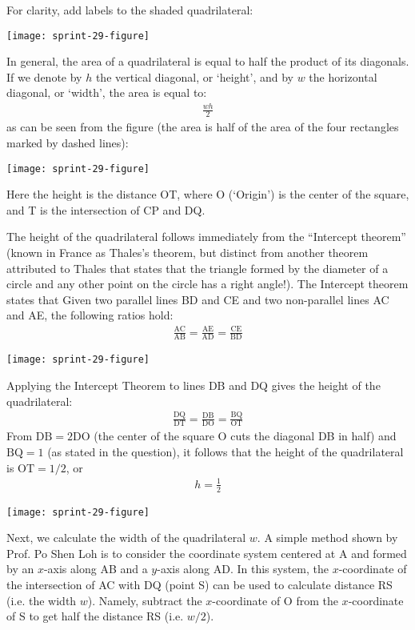 \documentclass[12pt]{article}
\begin{document}
\begin{answer}
For clarity, add labels to the shaded quadrilateral: 
\begin{center}
\texttt{[image: sprint-29-figure]}
\end{center}

In general, the area of a quadrilateral is equal to half the product of its diagonals. If we denote by $h$ the vertical diagonal, or `height', and by $w$ the horizontal diagonal, or `width', the area is equal to:
\begin{align*}
\frac{wh}{2}
\end{align*}
as can be seen from the figure (the area is half of the area of the four rectangles marked by dashed lines):
\begin{center}
\texttt{[image: sprint-29-figure]}
\end{center}
Here the height is the distance OT, where O (`Origin') is the center of the square, and T is the intersection of CP and DQ. 

The height of the quadrilateral follows immediately from the ``Intercept theorem'' (known in France as Thales's theorem, but distinct from another theorem attributed to Thales that states that the triangle formed by the diameter of a circle and any other point on the circle has a right angle!). The Intercept theorem states that Given two parallel lines BD and CE and two non-parallel lines AC and AE, the following ratios hold:
\begin{align*}
\frac{\text{AC}}{\text{AB}} 
  = \frac{\text{AE}}{\text{AD}} 
  = \frac{\text{CE}}{\text{BD}} 
\end{align*} 
\begin{center}
\texttt{[image: sprint-29-figure]}
\end{center}

Applying the Intercept Theorem to lines DB and DQ gives the height of the quadrilateral:
\begin{align*}
\frac{\text{DQ}}{\text{DT}} 
  = \frac{\text{DB}}{\text{DO}} 
  = \frac{\text{BQ}}{\text{OT}} 
\end{align*}
From $\text{DB}=2\text{DO}$ (the center of the square O cuts the diagonal DB in half) and $\text{BQ}=1$ (as stated in the question), it follows that the height of the quadrilateral is $\text{OT}=1/2$, or
\begin{align*}
h = \frac{1}{2}
\end{align*}
\begin{center}
\texttt{[image: sprint-29-figure]}
\end{center}
Next, we calculate the width of the quadrilateral $w$. A simple method shown by Prof. Po Shen Loh is to consider the coordinate system centered at A and formed by an $x$-axis along AB and a $y$-axis along AD. In this system, the $x$-coordinate of the intersection of AC with DQ (point S) can be used to calculate distance RS (i.e. the width $w$). Namely, subtract the $x$-coordinate of O from the $x$-coordinate of S to get half the distance RS (i.e. $w/2$). 


\end{answer}
\end{document}
